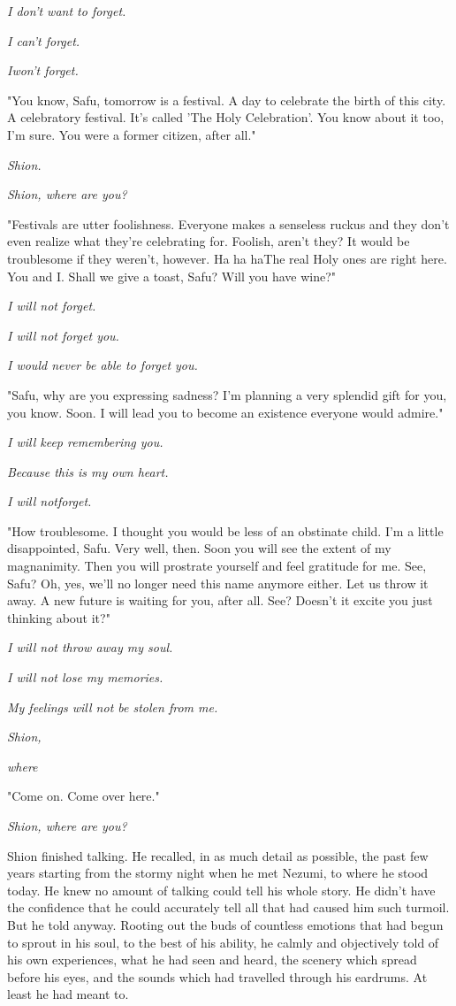 \emph{I don't want to forget.}

\emph{I can't forget.}

\emph{I\el won't forget.}

"You know, Safu, tomorrow is a festival. A day to celebrate the birth of
this city. A celebratory festival. It's called 'The Holy Celebration'.
You know about it too, I'm sure. You were a former citizen, after all."

\emph{Shion.}

\emph{Shion, where are you?}

"Festivals are utter foolishness. Everyone makes a senseless ruckus and
they don't even realize what they're celebrating for. Foolish, aren't
they? It would be troublesome if they weren't, however. Ha ha ha\el The
real Holy ones are right here. You and I. Shall we give a toast, Safu?
Will you have wine?"

\emph{I will not forget.}

\emph{I will not forget you.}

\emph{I would never be able to forget you.}

"Safu, why are you expressing sadness? I'm planning a very splendid gift
for you, you know. Soon. I will lead you to become an existence everyone
would admire."

\emph{I will keep remembering you.}

\emph{Because this is my own heart.}

\emph{I will not\el forget.}

"How troublesome. I thought you would be less of an obstinate child. I'm
a little disappointed, Safu. Very well, then. Soon you will see the
extent of my magnanimity. Then you will prostrate yourself and feel
gratitude for me. See, Safu? Oh, yes, we'll no longer need this name
anymore either. Let us throw it away. A new future is waiting for you,
after all. See? Doesn't it excite you just thinking about it?"

\emph{I will not throw away my soul.}

\emph{I will not lose my memories.}

\emph{My feelings will not be stolen from me.}

\emph{Shion,}

\emph{where\el }

"Come on. Come over here."

\emph{Shion, where are you?}

\myspace

Shion finished talking. He recalled, in as much detail as possible, the
past few years starting from the stormy night when he met Nezumi, to
where he stood today. He knew no amount of talking could tell his whole
story. He didn't have the confidence that he could accurately tell all
that had caused him such turmoil. But he told anyway. Rooting out the
buds of countless emotions that had begun to sprout in his soul, to the
best of his ability, he calmly and objectively told of his own
experiences, what he had seen and heard, the scenery which spread before
his eyes, and the sounds which had travelled through his eardrums. At
least he had meant to.

